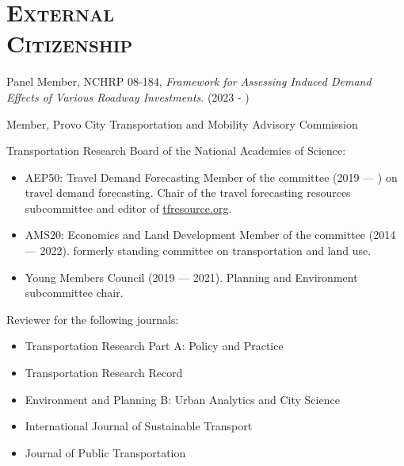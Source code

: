 \documentclass[margin,line]{res}
\newcommand{\secfont}{\scshape }
\newcommand{\acc}{\scshape }
\begin{document}
\begin{resume}
\begin{description}
\end{description}

\noindent\makebox[\linewidth]{\rule{\linewidth}{0.4pt}}
\section{\secfont External \\ Citizenship}



Panel Member, NCHRP 08-184, \textit{Framework for Assessing Induced Demand Effects of Various Roadway Investments}. (2023 - )

Member, Provo City Transportation and Mobility Advisory Commission

Transportation Research Board of the National Academies of Science:

\begin{itemize}
  \item AEP50: Travel Demand Forecasting Member of the committee (2019 --- ) on
  travel demand forecasting. Chair of the travel forecasting resources
  subcommittee and editor of \url{tfresource.org}.
  \item AMS20: Economics and Land Development Member of the committee (2014
  --- 2022). formerly standing committee on transportation and land use.
  \item Young Members Council (2019 --- 2021). Planning and Environment subcommittee
  chair.
\end{itemize}


Reviewer for the following journals:

\begin{itemize}
  \item Transportation Research Part A: Policy and Practice
  \item Transportation Research Record
  \item Environment and Planning B: Urban Analytics and City Science
  \item International Journal of Sustainable Transport
  \item Journal of Public Transportation
\end{itemize}


\end{resume}
\end{document}
